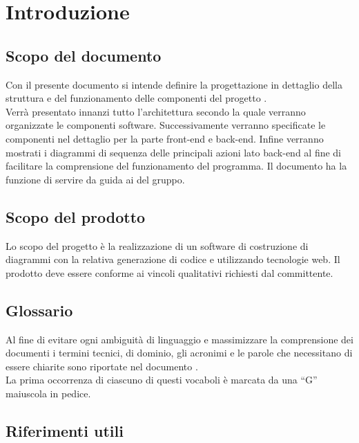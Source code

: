 \documentclass[../PianoDiQualifica.tex]{subfiles}
\begin{document}
	\section{Introduzione}
		\subsection{Scopo del documento} 
			Con il presente documento si intende definire la progettazione in dettaglio della struttura e del funzionamento delle componenti del progetto \progetto.\\
			Verrà presentato innanzi tutto l'architettura secondo la quale verranno
			organizzate le componenti software. Successivamente verranno specificate le componenti nel dettaglio per la parte front-end e back-end.
			Infine verranno mostrati i diagrammi di sequenza delle principali azioni lato back-end al fine di facilitare la comprensione del funzionamento del programma. %
			Il documento ha la funzione di servire da guida ai \programmatori del gruppo.
		\subsection{Scopo del prodotto}
			Lo scopo del progetto è la realizzazione di un software di
			costruzione di diagrammi  con la relativa generazione
			di codice  e  utilizzando tecnologie
			web. Il prodotto deve essere conforme ai vincoli qualitativi
			richiesti dal committente.
		\subsection{Glossario}
			Al fine di evitare ogni ambiguità di linguaggio e massimizzare la
			comprensione dei documenti i termini tecnici, di dominio, gli
			acronimi e le parole che necessitano di essere chiarite sono
			riportate nel documento \glossariov.\\
			La prima occorrenza di ciascuno di questi vocaboli è
			marcata da una ``G'' maiuscola in pedice.
		\subsection{Riferimenti utili}
\end{document}
